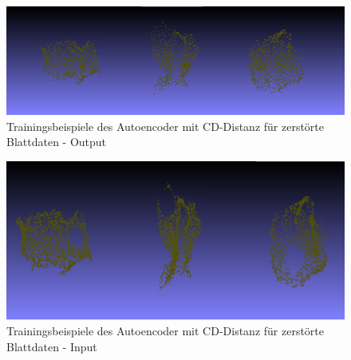 \documentclass{llncs}
\begin{document}
\begin{figure}[htbp] 
	\centering
	\includegraphics[width=1.0\textwidth]{autoencoder_destroyed_example_chamfer_fake.png}
	\caption{Trainingsbeispiele des Autoencoder mit CD-Distanz für zerstörte Blattdaten - Output}
	\label{fig:Bild68}
\end{figure}
\begin{figure}[htbp] 
	\centering
	\includegraphics[width=1.0\textwidth]{autoencoder_destroyed_example_chamfer_real.png}
	\caption{Trainingsbeispiele des Autoencoder mit CD-Distanz für zerstörte Blattdaten - Input}
	\label{fig:Bild69}
\end{figure}
\newpage
\end{document}
